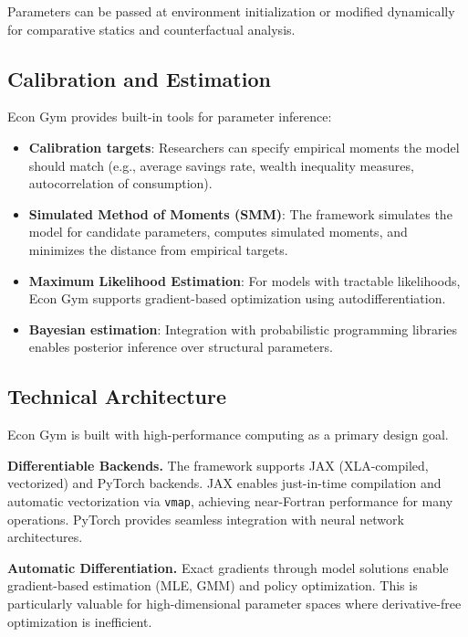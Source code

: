 \documentclass[12pt]{article}
\begin{document}
Parameters can be passed at environment initialization or modified dynamically for comparative statics and counterfactual analysis.

\subsection{Calibration and Estimation}

Econ Gym provides built-in tools for parameter inference:

\begin{itemize}
    \item \textbf{Calibration targets}: Researchers can specify empirical moments the model should match (e.g., average savings rate, wealth inequality measures, autocorrelation of consumption).
    
    \item \textbf{Simulated Method of Moments (SMM)}: The framework simulates the model for candidate parameters, computes simulated moments, and minimizes the distance from empirical targets.
    
    \item \textbf{Maximum Likelihood Estimation}: For models with tractable likelihoods, Econ Gym supports gradient-based optimization using autodifferentiation.
    
    \item \textbf{Bayesian estimation}: Integration with probabilistic programming libraries enables posterior inference over structural parameters.
\end{itemize}

\subsection{Technical Architecture}

Econ Gym is built with high-performance computing as a primary design goal.

\textbf{Differentiable Backends.} The framework supports JAX (XLA-compiled, vectorized) and PyTorch backends. JAX enables just-in-time compilation and automatic vectorization via \texttt{vmap}, achieving near-Fortran performance for many operations. PyTorch provides seamless integration with neural network architectures.

\textbf{Automatic Differentiation.} Exact gradients through model solutions enable gradient-based estimation (MLE, GMM) and policy optimization. This is particularly valuable for high-dimensional parameter spaces where derivative-free optimization is inefficient.
\end{document}
